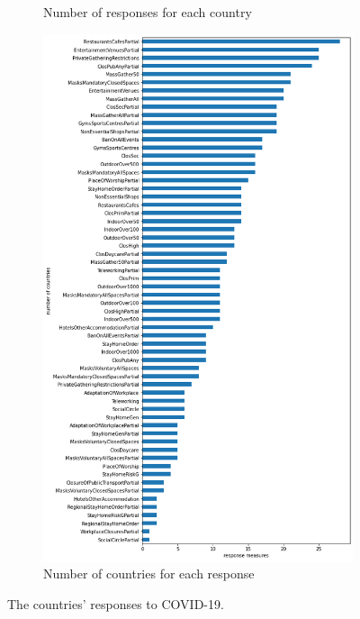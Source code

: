 \documentclass[11pt]{article}
\begin{document}
\begin{figure}[h]
\begin{subfigure}[b]{0.4\textwidth}
         \caption{Number of responses for each country}
         \label{fig:hist_response_by_countries}
     \end{subfigure}
     \begin{subfigure}[b]{0.475\textwidth}
         \centering
         \includegraphics[width=\textwidth]{hist_response_frequencies.png}
         \caption{Number of countries for each response}
         \label{fig:hist_response_frequencies}
     \end{subfigure}
     \caption{The countries' responses to COVID-19.}
\end{figure}
\end{document}
